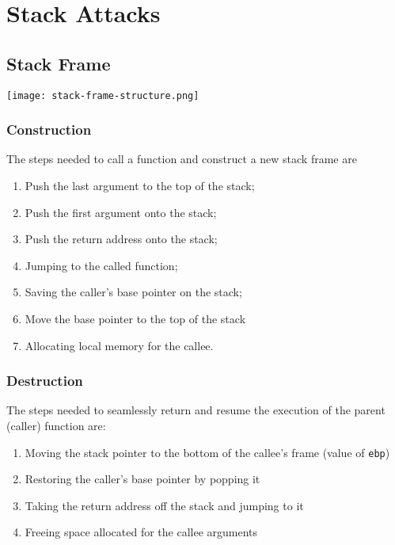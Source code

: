 \section{Stack Attacks}
\subsection{Stack Frame}
\begin{center}
  \texttt{[image: stack-frame-structure.png]}
\end{center}

\subsubsection{Construction}
The steps needed to call a function and construct a new stack frame are
\begin{enumerate}
  \item Push the last argument to the top of the stack;
  \item Push the first argument onto the stack;
  \item Push the return address onto the stack;
  \item Jumping to the called function;
  \item Saving the caller's base pointer on the stack;
  \item Move the base pointer to the top of the stack
  \item Allocating local memory for the callee.
\end{enumerate}

\subsubsection{Destruction}
The steps needed to seamlessly return and resume the execution of the parent
(caller) function are:
\begin{enumerate}
  \item Moving the stack pointer to the bottom of the callee's frame (value of
    \texttt{ebp})
  \item Restoring the caller's base pointer by popping it
  \item Taking the return address off the stack and jumping to it
  \item Freeing space allocated for the callee arguments
\end{enumerate}

